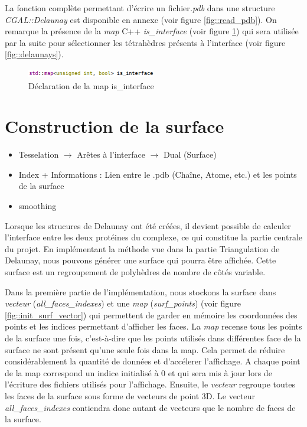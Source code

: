 La fonction complète permettant d'écrire un fichier\textit{.pdb} dans une structure
\textit{CGAL::Delaunay} est disponible en annexe (voir figure \ref{fig::read_pdb}).
On remarque la présence de la \textit{map} C++ \textit{is\_interface}
(voir figure \ref{fig::is_interface}) qui sera utilisée par la suite
pour sélectionner les tétrahèdres présents à l'interface (voir figure \ref{fig::delaunays}).

\begin{figure}[ht]
\centering
  \includegraphics[width=0.5\textwidth]{figures/is_interface.png}
  \caption{Déclaration de la map is\_interface}
  \label{fig::is_interface}
\end{figure}

\section{Construction de la surface}
\begin{itemize}
  \item Tesselation $\to$ Arêtes à l'interface $\to$ Dual (Surface)
  \item Index + Informations : Lien entre le .pdb (Chaîne, Atome, etc.) et les points de la surface
  \item smoothing
\end{itemize}

Lorsque les strucures de Delaunay ont été créées, il devient possible de calculer l'interface
entre les deux protéines du complexe, ce qui constitue la partie centrale du projet.
En implémentant la méthode vue dans la partie Triangulation de Delaunay, nous pouvons générer
une surface qui pourra être affichée. Cette surface est un regroupement de polyhèdres
de nombre de côtés variable.



Dans la première partie de l'implémentation, nous stockons la surface dans \textit{vecteur}
(\textit{all\_faces\_indexes})
et une \textit{map} (\textit{surf\_points}) (voir figure \ref{fig::init_surf_vector}) qui permettent de garder
en mémoire les coordonnées des points
et les indices permettant d'afficher les faces. La \textit{map} recense tous les points
de la surface une fois, c'est-à-dire que les points utilisés dans différentes face de la surface
ne sont présent qu'une seule fois dans la map. Cela permet de réduire considérablement
la quantité de données et d'accélerer l'affichage. A chaque point de la map correspond
un indice initialisé à 0 et qui sera mis à jour lors de l'écriture des fichiers utilisés
pour l'affichage. Ensuite, le \textit{vecteur} regroupe toutes les faces de la surface
sous forme de vecteurs de point 3D. Le vecteur \textit{all\_faces\_indexes} contiendra
donc autant de vecteurs que le nombre de faces de la surface.


